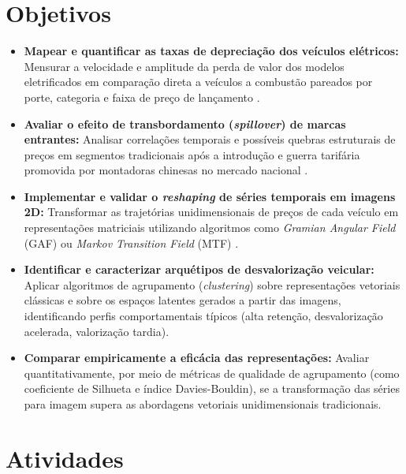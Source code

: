 \documentclass{article}
\begin{document}
\section{Objetivos}

\begin{itemize}
      \item \textbf{Mapear e quantificar as taxas de depreciação dos veículos elétricos:} Mensurar a velocidade e amplitude da perda de valor dos modelos eletrificados em comparação direta a veículos a combustão pareados por porte, categoria e faixa de preço de lançamento \cite{schloter2022empirical}.
      
      \item \textbf{Avaliar o efeito de transbordamento (\textit{spillover}) de marcas entrantes:} Analisar correlações temporais e possíveis quebras estruturais de preços em segmentos tradicionais após a introdução e guerra tarifária promovida por montadoras chinesas no mercado nacional \cite{li2026global, li2025rise}.

      \item \textbf{Implementar e validar o \textit{reshaping} de séries temporais em imagens 2D:} Transformar as trajetórias unidimensionais de preços de cada veículo em representações matriciais utilizando algoritmos como \textit{Gramian Angular Field} (GAF) ou \textit{Markov Transition Field} (MTF) \cite{wu2023imaging, jueco2024performance}.

      \item \textbf{Identificar e caracterizar arquétipos de desvalorização veicular:} Aplicar algoritmos de agrupamento (\textit{clustering}) sobre representações vetoriais clássicas e sobre os espaços latentes gerados a partir das imagens, identificando perfis comportamentais típicos (alta retenção, desvalorização acelerada, valorização tardia).

      \item \textbf{Comparar empiricamente a eficácia das representações:} Avaliar quantitativamente, por meio de métricas de qualidade de agrupamento (como coeficiente de Silhueta e índice Davies-Bouldin), se a transformação das séries para imagem supera as abordagens vetoriais unidimensionais tradicionais.
\end{itemize}

\section{Atividades}
\end{document}
